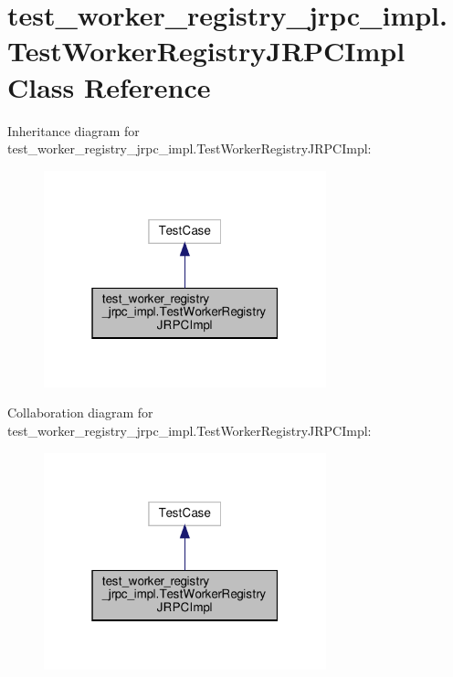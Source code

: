 \hypertarget{classtest__worker__registry__jrpc__impl_1_1TestWorkerRegistryJRPCImpl}{}\section{test\+\_\+worker\+\_\+registry\+\_\+jrpc\+\_\+impl.\+Test\+Worker\+Registry\+J\+R\+P\+C\+Impl Class Reference}
\label{classtest__worker__registry__jrpc__impl_1_1TestWorkerRegistryJRPCImpl}


Inheritance diagram for test\+\_\+worker\+\_\+registry\+\_\+jrpc\+\_\+impl.\+Test\+Worker\+Registry\+J\+R\+P\+C\+Impl\+:
\nopagebreak
\begin{figure}[H]
\begin{center}
\leavevmode
\includegraphics[width=232pt]{classtest__worker__registry__jrpc__impl_1_1TestWorkerRegistryJRPCImpl__inherit__graph}
\end{center}
\end{figure}


Collaboration diagram for test\+\_\+worker\+\_\+registry\+\_\+jrpc\+\_\+impl.\+Test\+Worker\+Registry\+J\+R\+P\+C\+Impl\+:
\nopagebreak
\begin{figure}[H]
\begin{center}
\leavevmode
\includegraphics[width=232pt]{classtest__worker__registry__jrpc__impl_1_1TestWorkerRegistryJRPCImpl__coll__graph}
\end{center}
\end{figure}
